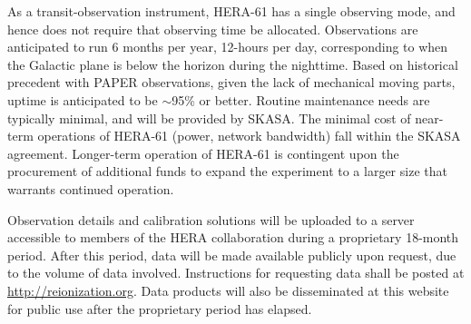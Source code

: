 \documentclass[preprint]{aastex}
\begin{document}
As a transit-observation instrument, HERA-61 has a single observing mode, and hence does not
require that observing time be allocated.  Observations are anticipated to run 6 months per year,
12-hours per day, corresponding to when the Galactic plane is below the horizon during
the nighttime.  Based on historical precedent with PAPER observations, given the lack of mechanical
moving parts, uptime is anticipated to be $\sim$95\% or better.  Routine maintenance needs are typically
minimal, and will be provided by SKASA.  The minimal cost of near-term operations of HERA-61 
(power, network bandwidth) fall within the SKASA agreement.  Longer-term operation of HERA-61 is contingent
upon the procurement of additional funds to expand the experiment to a larger size that warrants
continued operation.

Observation details and calibration
solutions will be uploaded to a server accessible to members of the HERA collaboration during a
proprietary 18-month period.  After this period, data will be made available publicly upon request,
due to the volume of data involved.  Instructions for requesting data shall be posted at 
\url{http://reionization.org}.  Data products will also be disseminated at this website for public
use after the proprietary period has elapsed.
\end{document}
